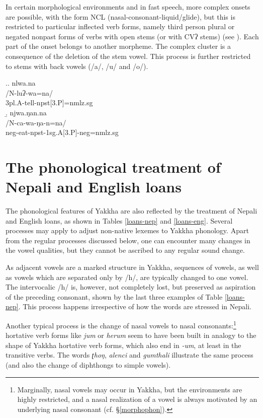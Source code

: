 In certain morphological environments and in fast speech, more complex onsets are possible, with the form NCL (nasal-consonant-liquid/glide), but this is restricted to particular inflected verb forms, namely third person plural or negated nonpast forms of verbs with open stems (or with CVʔ stems) (see \Next). Each part of the onset belongs to another morpheme. The complex cluster is a consequence of the deletion of the stem vowel. This process is further restricted to stems with back vowels (/a/, /u/ and /o/). 



\ex.\a. \glll nlwa.na\\
/N-luʔ-wa=na/\\
{\sc 3pl.A-}tell{\sc -npst[3.P]=nmlz.sg}\\
\b. \glll njwa.ŋan.na\\
/N-ca-wa-ŋa-n=na/\\
{\sc neg-}eat{\sc -npst-1sg.A[3.P]-neg=nmlz.sg}\\



\section{The phonological treatment of Nepali and English loans}\label{loansphon}

The phonological features of Yakkha are also reflected by the treatment of Nepali and English loans, as shown in Tables \ref{loans-nep} and \ref{loans-eng}. Several processes may apply to adjust non-native lexemes to Yakkha phonology. Apart from the regular processes discussed below, one can encounter many changes in the vowel qualities, but they cannot be ascribed to any regular sound change.

As adjacent vowels are a marked structure in Yakkha, sequences of vowels, as well as  vowels which are separated only by /h/, are typically changed to one vowel. The intervocalic /h/ is, however, not completely lost, but preserved as aspiration of the preceding consonant, shown by the last three examples of Table \ref{loans-nep}. This process  happens irrespective of how the words are stressed in Nepali.

 Another typical process is the change of nasal vowels to nasal consonants:\footnote{Marginally, nasal vowels may occur in Yakkha, but the environments are highly restricted, and a nasal realization of a vowel is always motivated by an underlying nasal consonant (cf. §\ref{morphophon}).}  hortative verb forms like  \emph{jum}  or \emph{herum}  seem to have been built in analogy to the shape of Yakkha hortative verb forms, which also end in \emph{-um}, at least in the transitive verbs. The words  \emph{ʈhoŋ}, \emph{alenci} and \emph{gumthali} illustrate the same process (and also the change of diphthongs to simple vowels). 
 
